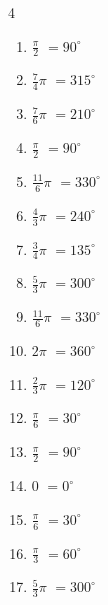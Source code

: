\begin{multicols}{4}
\begin{enumerate}
  \item $\displaystyle \frac{\pi}{2}$
        $\displaystyle =90^{\circ}$

  \item $\displaystyle \frac{7}{4}\pi$
        $\displaystyle =315^{\circ}$

  \item $\displaystyle \frac{7}{6}\pi$
        $\displaystyle =210^{\circ}$

  \item $\displaystyle \frac{\pi}{2}$
        $\displaystyle =90^{\circ}$

  \item $\displaystyle \frac{11}{6}\pi$
        $\displaystyle =330^{\circ}$

  \item $\displaystyle \frac{4}{3}\pi$
        $\displaystyle =240^{\circ}$

  \item $\displaystyle \frac{3}{4}\pi$
        $\displaystyle =135^{\circ}$

  \item $\displaystyle \frac{5}{3}\pi$
        $\displaystyle =300^{\circ}$

  \item $\displaystyle \frac{11}{6}\pi$
        $\displaystyle =330^{\circ}$

  \item $\displaystyle 2\pi$
        $\displaystyle =360^{\circ}$

  \item $\displaystyle \frac{2}{3}\pi$
        $\displaystyle =120^{\circ}$

  \item $\displaystyle \frac{\pi}{6}$
        $\displaystyle =30^{\circ}$

  \item $\displaystyle \frac{\pi}{2}$
        $\displaystyle =90^{\circ}$

  \item $\displaystyle 0$
        $\displaystyle =0^{\circ}$

  \item $\displaystyle \frac{\pi}{6}$
        $\displaystyle =30^{\circ}$

\columnbreak %

  \item $\displaystyle \frac{\pi}{3}$
        $\displaystyle =60^{\circ}$

  \item $\displaystyle \frac{5}{3}\pi$
        $\displaystyle =300^{\circ}$


\end{enumerate}
\end{multicols}
